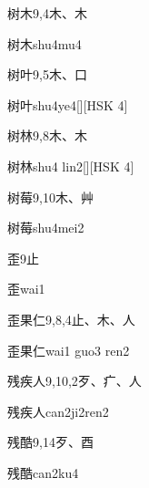 \begin{entry}{树木}{9,4}{⽊、⽊}
  \begin{phonetics}{树木}{shu4mu4}
  \end{phonetics}
\end{entry}

\begin{entry}{树叶}{9,5}{⽊、⼝}
  \begin{phonetics}{树叶}{shu4ye4}[][HSK 4]
  \end{phonetics}
\end{entry}

\begin{entry}{树林}{9,8}{⽊、⽊}
  \begin{phonetics}{树林}{shu4 lin2}[][HSK 4]
  \end{phonetics}
\end{entry}

\begin{entry}{树莓}{9,10}{⽊、⾋}
  \begin{phonetics}{树莓}{shu4mei2}
  \end{phonetics}
\end{entry}

\begin{entry}{歪}{9}{⽌}
  \begin{phonetics}{歪}{wai1}
  \end{phonetics}
\end{entry}

\begin{entry}{歪果仁}{9,8,4}{⽌、⽊、⼈}
  \begin{phonetics}{歪果仁}{wai1 guo3 ren2}
  \end{phonetics}
\end{entry}

\begin{entry}{残疾人}{9,10,2}{⽍、⽧、⼈}
  \begin{phonetics}{残疾人}{can2ji2ren2}
  \end{phonetics}
\end{entry}

\begin{entry}{残酷}{9,14}{⽍、⾣}
  \begin{phonetics}{残酷}{can2ku4}
  \end{phonetics}
\end{entry}

